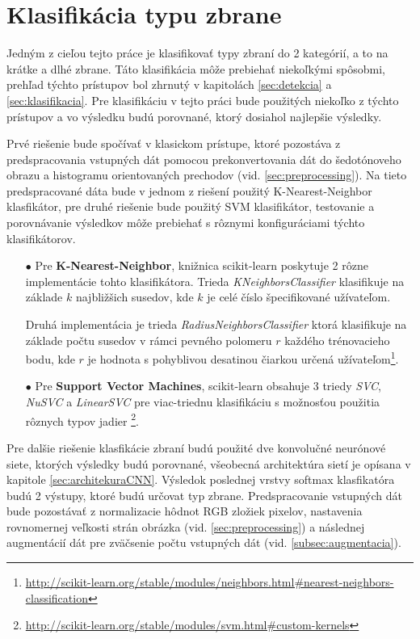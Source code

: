 
\section{Klasifikácia typu zbrane}
\label{sec:klasfikaciatypuzbrane}
Jedným z cieľou tejto práce je klasifikovať typy zbraní do 2 kategórií, a to na krátke a dlhé zbrane.
Táto klasifikácia môže prebiehať niekoľkými spôsobmi, prehľad týchto prístupov bol zhrnutý v kapitolách \ref{sec:detekcia} a \ref{sec:klasifikacia}.
Pre klasifikáciu v tejto práci bude použitých niekoľko z týchto prístupov a vo výsledku budú porovnané, ktorý dosiahol najlepšie výsledky.

Prvé riešenie bude spočívať v klasickom prístupe, ktoré pozostáva z predspracovania vstupných dát pomocou prekonvertovania dát do šedotónoveho obrazu a histogramu orientovaných prechodov (vid. \ref{sec:preprocessing}).
Na tieto predspracované dáta bude v jednom z riešení použitý K-Nearest-Neighbor klasfikátor, pre druhé riešenie bude použitý SVM klasifikátor, testovanie
    a porovnávanie výsledkov môže prebiehať s rôznymi konfiguráciami týchto klasifikátorov.
\begin{enumerate}
    \item[$\bullet$] Pre \textbf{K-Nearest-Neighbor}, knižnica scikit-learn poskytuje 2 rôzne implementácie tohto klasifikátora.
    Trieda \textit{KNeighborsClassifier} klasifikuje na základe $k$ najbližšich susedov, kde $k$ je celé číslo špecifikované užívateľom.
    
    Druhá implementácia je trieda \textit{RadiusNeighborsClassifier} ktorá klasifikuje na základe počtu susedov v rámci pevného polomeru $r$ každého trénovacieho bodu,
        kde $r$ je hodnota s pohyblivou desatinou čiarkou určená užívateľom\footnote{\url{http://scikit-learn.org/stable/modules/neighbors.html\#nearest-neighbors-classification}}.
    \item[$\bullet$] Pre \textbf{Support Vector Machines}, scikit-learn obsahuje 3 triedy \textit{SVC}, \textit{NuSVC} a \textit{LinearSVC} pre viac-triednu
        klasifikáciu s možnosťou použitia rôznych typov jadier \footnote{\url{http://scikit-learn.org/stable/modules/svm.html\#custom-kernels}}.
\end{enumerate}

Pre dalšie riešenie klasfikácie zbraní budú použité dve konvolučné neurónové siete, ktorých výsledky budú porovnané, všeobecná architektúra sietí je opísana v kapitole \ref{sec:architekuraCNN}.
Výsledok poslednej vrstvy softmax klasfikatóra budú 2 výstupy, ktoré budú určovat typ zbrane.
Predspracovanie vstupných dát bude pozostávať z normalizacie hôdnot RGB zložiek pixelov, nastavenia rovnomernej veľkosti strán obrázka (vid. \ref{sec:preprocessing})
    a následnej augmentácií dát pre zväčsenie počtu vstupných dát (vid. \ref{subsec:augmentacia}).
